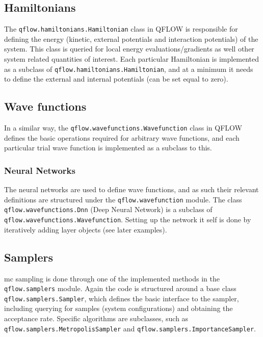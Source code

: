 \documentclass[Thesis.tex]{subfiles}
\begin{document}
\subsection{Hamiltonians}

The \texttt{qflow.\-hamiltonians.\-Hamiltonian} class in QFLOW is responsible for defining the energy
(kinetic, external potentials and interaction potentials) of the system. This
class is queried for local energy evaluations/gradients as well other system
related quantities of interest. Each particular Hamiltonian is implemented as a
subclass of \texttt{qflow.\-hamiltonians.\-Hamiltonian}, and at a minimum it needs to define the
external and internal potentials (can be set equal to zero).

\subsection{Wave functions}

In a similar way, the \texttt{qflow.\-wavefunctions.\-Wavefunction} class in QFLOW defines the basic
operations required for arbitrary wave functions, and each particular trial wave
function is implemented as a subclass to this.

\subsubsection{Neural Networks}

The neural networks are used to define wave functions, and as such their
relevant definitions are structured under the \texttt{qflow.\-wavefunction} module. The
class \texttt{qflow.\-wavefunctions.\-Dnn} (Deep Neural Network) is a subclass of \texttt{qflow.\-wavefunctions.\-Wavefunction}.
Setting up the network it self is done by iteratively adding layer objects (see
later examples).

\subsection{Samplers}

\gls{mc} sampling is done through one of the implemented methods in the
\texttt{qflow.samplers} module. Again the code is structured around a base
class \texttt{qflow.samplers.Sampler}, which defines the basic interface to the
sampler, including querying for samples (system configurations) and obtaining
the acceptance rate. Specific algorithms are subclasses, such as
\texttt{qflow.\-samplers.\-MetropolisSampler} and
\texttt{qflow.\-samplers.\-ImportanceSampler}.
\end{document}
